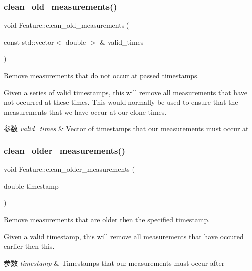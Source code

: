 \subsubsection{\texorpdfstring{clean\+\_\+old\+\_\+measurements()}{clean\_old\_measurements()}}
{\footnotesize\ttfamily void Feature\+::clean\+\_\+old\+\_\+measurements (\begin{DoxyParamCaption}\item[{const std\+::vector$<$ double $>$ \&}]{valid\+\_\+times }\end{DoxyParamCaption})}



Remove measurements that do not occur at passed timestamps. 

Given a series of valid timestamps, this will remove all measurements that have not occurred at these times. This would normally be used to ensure that the measurements that we have occur at our clone times.


\begin{DoxyParams}{参数}
{\em valid\+\_\+times} & Vector of timestamps that our measurements must occur at \\
\hline
\end{DoxyParams}
\mbox{\label{classov__core_1_1Feature_ad5426e15b7fb0f1f315c12465c63787d}} 
\subsubsection{\texorpdfstring{clean\+\_\+older\+\_\+measurements()}{clean\_older\_measurements()}}
{\footnotesize\ttfamily void Feature\+::clean\+\_\+older\+\_\+measurements (\begin{DoxyParamCaption}\item[{double}]{timestamp }\end{DoxyParamCaption})}



Remove measurements that are older then the specified timestamp. 

Given a valid timestamp, this will remove all measurements that have occured earlier then this.


\begin{DoxyParams}{参数}
{\em timestamp} & Timestamps that our measurements must occur after \\
\hline
\end{DoxyParams}
